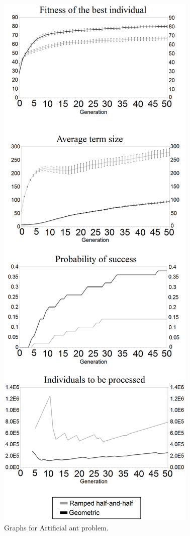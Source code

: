 \documentclass[conference]{IEEEtran}
\begin{document}
\begin{figure}[!ht]
  \centering
  \caption{Graphs for Artificial ant problem.}
  \includegraphics[scale=0.112]{imgs/ANT.eps}
\end{figure}
\end{document}
